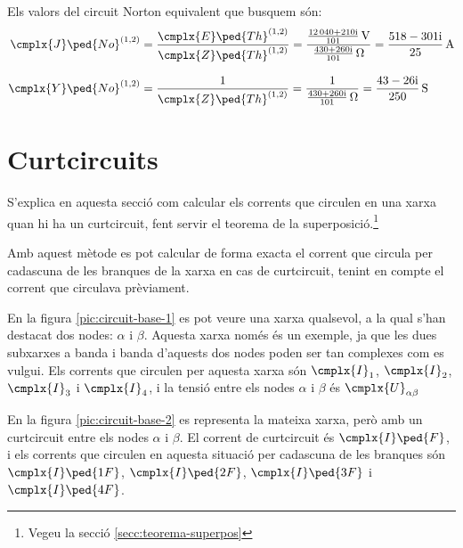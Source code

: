 \begin{exemple}
    Els valors del circuit Norton equivalent que busquem són:
    \begin{align*}
       \cmplx{J}\ped{No}^{(1,2)} &= \frac{\cmplx{E}\ped{Th}^{(1,2)}}{\cmplx{Z}\ped{Th}^{(1,2)}} =
       \frac{\frac{\complexnum{12040+j210}}{101}\,\unit{V}}{\frac{\complexnum{430+j260}}{101}\,\unit{\ohm}} =
       \frac{\complexnum{518-j301}}{25}\,\unit{A} \\[2ex]
       \cmplx{Y}\ped{No}^{(1,2)} &= \frac{1}{\cmplx{Z}\ped{Th}^{(1,2)}} =
       \frac{1}{\frac{\complexnum{430+j260}}{101}\,\unit{\ohm}} = \frac{\complexnum{43-j26}}{250}\,\unit{S}
    \end{align*}

\end{exemple}


\section{Curtcircuits}\label{sec:xarxes-curtcircuits}

S'explica en aquesta secció  com calcular els corrents que circulen en una xarxa quan hi ha un curtcircuit, fent servir el teorema de la superposició.\footnote{Vegeu la secció \ref{secc:teorema-superpos}}

Amb aquest mètode es pot calcular de forma exacta el corrent que circula per cadascuna de les branques de la xarxa en cas de curtcircuit, tenint en compte el corrent que circulava prèviament.

En la figura \vref{pic:circuit-base-1} es pot veure una xarxa qualsevol, a la qual s'han destacat dos nodes: $\alpha$ i $\beta$. Aquesta xarxa només és un exemple, ja que les dues subxarxes a banda i banda d'aquests dos nodes poden ser tan complexes com es vulgui. Els corrents que circulen per aquesta xarxa són $\cmplx{I}_1$, $\cmplx{I}_2$, $\cmplx{I}_3$ i $\cmplx{I}_4$, i la tensió entre els nodes $\alpha$ i $\beta$ és $\cmplx{U}_{\alpha\beta}$

\begin{center}
	
	\label{pic:circuit-base-1}
\end{center}

En la figura \vref{pic:circuit-base-2} es representa la mateixa xarxa, però amb un curtcircuit entre  els nodes $\alpha$ i $\beta$. El corrent de curtcircuit és $\cmplx{I}\ped{F}$, i els corrents que circulen en aquesta situació per cadascuna de les branques són $\cmplx{I}\ped{1F}$, $\cmplx{I}\ped{2F}$, $\cmplx{I}\ped{3F}$ i $\cmplx{I}\ped{4F}$.

